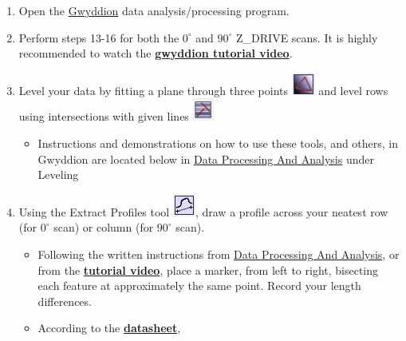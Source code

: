 \documentclass{../lab}
\begin{document}
\begin{enumerate}
    \item Open the \hyperref[subsec:Gwyddion]{Gwyddion} data analysis/processing program.

    \item Perform steps 13-16 for both the $0^\circ$ and $90^\circ$ Z\_DRIVE scans. It is highly recommended to watch the \href{http://experimentationlab.berkeley.edu/sites/default/files/AFMImages/gwyddion1.mp4.mp4}{\textbf{gwyddion tutorial video}}.

    \item Level your data by fitting a plane through three points \includegraphics[height=2em]{images/44.png} and level rows using intersections with given lines \includegraphics[height=2em]{images/46.png}

    \begin{itemize}
        \item Instructions and demonstrations on how to use these tools, and others, in Gwyddion are located below in \hyperref[sec:DataProcessingAndAnalysis]{Data Processing And Analysis} under Leveling
    \end{itemize}

    \item Using the Extract Profiles tool \includegraphics[height=2em]{images/profiles.png}, draw a profile across your neatest row (for $0^\circ$ scan) or column (for $90^\circ$ scan).

    \begin{itemize}
        \item Following the written instructions from \hyperref[sec:DataProcessingAndAnalysis]{Data Processing And Analysis}, or from the \href{http://experimentationlab.berkeley.edu/sites/default/files/AFMImages/gwyddion1.mp4.mp4}{\textbf{tutorial video}}, place a marker, from left to right, bisecting each feature at approximately the same point.  Record your length differences.

        \item According to the \href{http://experimentationlab.berkeley.edu/sites/default/files/AFMImages/Reference-\%20sample-SHS-01\_3\_datasheet.pdf}{\textbf{datasheet}},


\end{itemize}
\end{enumerate}
\end{document}
